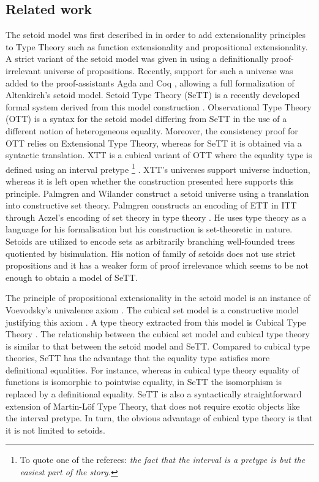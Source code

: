 \documentclass[autoref]{llncs}
\begin{document}

\subsection{Related work}

The setoid model was first described in \cite{hofmann} in order to add
extensionality principles to Type Theory such as function extensionality and
propositional extensionality. A strict variant of the setoid model was given in
\cite{setoid99} using a definitionally proof-irrelevant universe of
propositions. Recently, support for such a universe was added to the
proof-assistants Agda and Coq \cite{agda-prop}, allowing a full formalization of
Altenkirch's setoid model. Setoid Type Theory (SeTT) is a recently developed
formal system derived from this model construction \cite{mpc19}. Observational
Type Theory (OTT) \cite{alti:ott-conf} is a syntax for the setoid
model differing from SeTT in the use of a different notion of heterogeneous
equality. Moreover, the consistency proof for OTT relies on Extensional Type
Theory, whereas for SeTT it is obtained via a syntactic translation.
%
XTT \cite{xtt} is a cubical variant of OTT where the equality type is defined
using an interval pretype
\footnote{To quote one of the referees: \emph{the fact that the
    interval is a pretype is but the easiest part of the story.}}
. XTT's universes support universe induction, whereas
it is left open whether the construction presented here supports this principle.
%
Palmgren and Wilander \cite{2014arXiv1408.1364P} construct a setoid
universe using a translation into constructive set theory. Palmgren
\cite{2019arXiv190901414P} constructs an encoding of ETT in ITT
through Aczel's encoding of set theory in type theory
\cite{ACZEL197855}. He uses type theory as a language for his
formalisation but his construction is set-theoretic in nature. Setoids
are utilized to encode sets as arbitrarily branching well-founded
trees quotiented by bisimulation. His notion of family of setoids does
not use strict propositions and it has a weaker form of proof
irrelevance which seems to be not enough to obtain a model of SeTT.

The principle of propositional extensionality in the setoid model is an instance
of Voevodsky's univalence axiom \cite{hottbook}. The cubical set model is a
constructive model justifying this axiom \cite{cubical-sets}. A type theory
extracted from this model is Cubical Type Theory \cite{cubical}. The
relationship between the cubical set model and cubical type theory is similar to
that between the setoid model and SeTT.
%
Compared to cubical type theories, SeTT has the advantage that the equality type
satisfies more definitional equalities. For instance, whereas in cubical type
theory equality of functions is isomorphic to pointwise equality, in SeTT the
isomorphism is replaced by a definitional equality. SeTT is also a syntactically
straightforward extension of Martin-L\"of Type Theory, that does not require
exotic objects like the interval pretype. In turn, the obvious advantage of
cubical type theory is that it is not limited to setoids.
\end{document}
